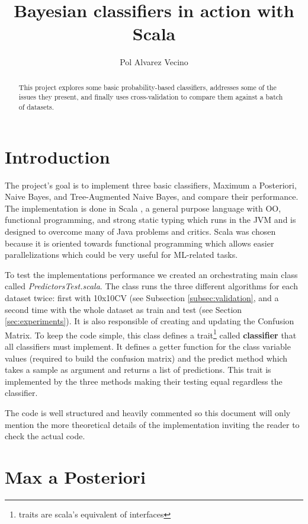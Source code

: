 \documentclass[a4paper,10pt]{article}
\title{Bayesian classifiers in action with Scala}
\author{Pol Alvarez Vecino}
\begin{document}
\maketitle

\begin{abstract}

This project explores some basic probability-based classifiers, addresses some of the issues they present, and finally uses cross-validation to compare them against a batch of datasets. 

\end{abstract}

\section{Introduction}

The project's goal is to implement three basic classifiers, Maximum a Posteriori, Naive Bayes, and Tree-Augmented Naive Bayes, and compare their performance. The implementation is done in Scala \cite{Odersky2011}, a general purpose language with OO, functional programming, and strong static typing which runs in the JVM and is designed to overcome many of Java problems and critics. Scala was chosen because it is oriented towards functional programming which allows easier parallelizations which could be very useful for ML-related tasks.

To test the implementations performance we created an orchestrating main class called \textit{PredictorsTest.scala}. The class runs the three different algorithms for each dataset twice: first with 10x10CV (see Subsection \ref{subsec:validation}, and a second time with the whole dataset as train and test (see Section \ref{sec:experiments}). It is also responsible of creating and updating the Confusion Matrix. To keep the code simple, this class defines a trait\footnote{traits are scala's equivalent of interfaces} called \textbf{classifier} that all classifiers must implement. It defines a getter function for the class variable values (required to build the confusion matrix) and the predict method which takes a sample as argument and returns a list of predictions. This trait is implemented by the three methods making their testing equal regardless the classifier.

The code is well structured and heavily commented so this document will only mention the more theoretical details of the implementation inviting the reader to check the actual code.

\section{Max a Posteriori}
\end{document}
